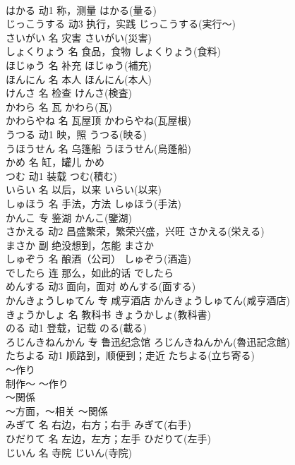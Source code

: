 \documentclass[8pt]{extreport}
\begin{document}
\begin{CJK}{UTF8}{min}
\\	はかる	动1	称，测量	はかる(量る)	
\\	じっこうする	动3	执行，实践	じっこうする(実行～)	
\\	さいがい	名	灾害	さいがい(災害)	
\\	しょくりょう	名	食品，食物	しょくりょう(食料)	
\\	ほじゅう	名	补充	ほじゅう(補充)	
\\	ほんにん	名	本人	ほんにん(本人)	
\\	けんさ	名	检查	けんさ(検査)	
\\	かわら	名	瓦	かわら(瓦)	
\\	かわらやね	名	瓦屋顶	かわらやね(瓦屋根)	
\\	うつる	动1	映，照	うつる(映る)	
\\	うほうせん	名	乌篷船	うほうせん(烏蓬船)	
\\	かめ	名	缸，罐儿	かめ	
\\	つむ	动1	装载	つむ(積む)	
\\	いらい	名	以后，以来	いらい(以来)	
\\	しゅほう	名	手法，方法	しゅほう(手法)	
\\	かんこ	专	鉴湖	かんこ(鑒湖)	
\\	さかえる	动2	昌盛繁荣，繁荣兴盛，兴旺	さかえる(栄える)	
\\	まさか	副	绝没想到，怎能	まさか	
\\	しゅぞう	名	酿酒（公司）	しゅぞう(酒造)	
\\	でしたら	连	那么，如此的话	でしたら	
\\	めんする	动3	面向，面对	めんする(面する)	
\\	かんきょうしゅてん	专	咸亨酒店	かんきょうしゅてん(咸亨酒店)	
\\	きょうかしょ	名	教科书	きょうかしょ(教科書)	
\\	のる	动1	登载，记载	のる(載る)	
\\	ろじんきねんかん	专	鲁迅纪念馆	ろじんきねんかん(魯迅記念館)	
\\	たちよる	动1	顺路到，顺便到；走近	たちよる(立ち寄る)	
\\	～作り	
\\	制作～	～作り	
\\	～関係	
\\	～方面，～相关	～関係	
\\	みぎて	名	右边，右方；右手	みぎて(右手)	
\\	ひだりて	名	左边，左方；左手	ひだりて(左手)	
\\	じいん	名	寺院	じいん(寺院)	

\end{CJK}
\end{document}
